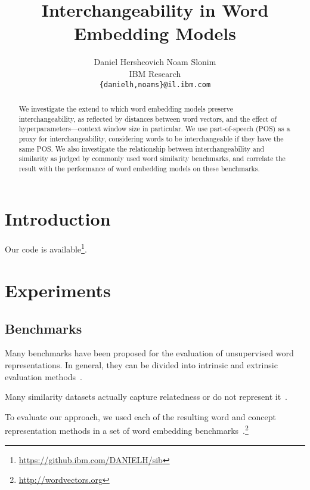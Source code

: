 \documentclass{article}
\title{Interchangeability in Word Embedding Models}
\author{
Daniel Hershcovich \qquad Noam Slonim \\
IBM Research\\
\texttt{\{danielh,noams\}@il.ibm.com}
}
\begin{document}
    \maketitle

    \begin{abstract}
    We investigate the extend to which word embedding models
    preserve interchangeability, as reflected by distances between
    word vectors, and the effect of hyperparameters---context window size in particular.
    We use part-of-speech (POS) as a proxy for interchangeability,
    considering words to be interchangeable if they have the same POS.
    We also investigate the relationship between interchangeability
    and similarity as judged by commonly used word similarity benchmarks,
    and correlate the result with the performance of word embedding models
    on these benchmarks.
    \end{abstract}

    \section{Introduction}\label{sec:introduction}

    
    Our code is available\footnote{\url{https://github.ibm.com/DANIELH/sib}}.


    \section{Experiments}\label{sec:experiments}
    
    \subsection{Benchmarks}\label{sec:benchmarks}

    Many benchmarks have been proposed for the evaluation of unsupervised word
    representations.
    In general, they can be divided into intrinsic and extrinsic evaluation methods~\cite{schnabel2015evaluation,jastrzebski2017evaluate,alshargi2018concept2vec,bakarov2018survey,chiu2016intrinsic}.

    Many similarity datasets actually capture relatedness or do not represent it~\cite{hill2015simlex,avraham2016improving}.

    To evaluate our approach, we used each of the resulting word and concept
    representation methods in a set of word embedding
    benchmarks~\cite{faruqui-2014:SystemDemo}.\footnote{\url{http://wordvectors.org}}
    
\end{document}
